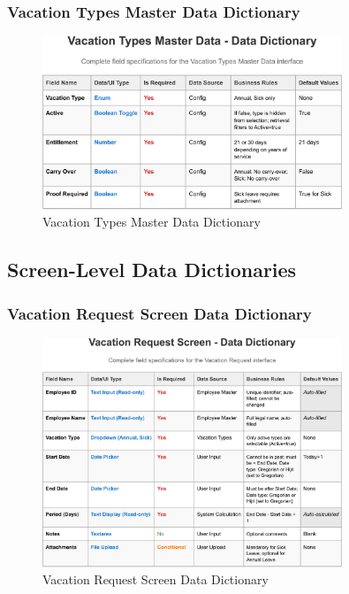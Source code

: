 \documentclass[12pt,a4paper]{article}
\begin{document}
\subsubsection{Vacation Types Master Data Dictionary}
\begin{figure}[H]
\centering
\includegraphics[width=0.8\textwidth]{Data-Dictionary/Master-Data-Dictionaries/Vacation-Types-Master-Data-Data-Dictionary/Vacation-Types-Master-Data-Data-Dictionary-1.png}
\caption{Vacation Types Master Data Dictionary}
\label{fig:vacation-types-master-data}
\end{figure}

\subsection{Screen-Level Data Dictionaries}

\subsubsection{Vacation Request Screen Data Dictionary}
\begin{figure}[H]
\centering
\includegraphics[width=0.8\textwidth]{Data-Dictionary/Screen-Data-Dictionaries/Vacation-Request-Screen-Data-Dictionary/Vacation-Request-Screen-Data-Dictionary-1.png}
\caption{Vacation Request Screen Data Dictionary}
\label{fig:vacation-request-data-dict}
\end{figure}
\end{document}
